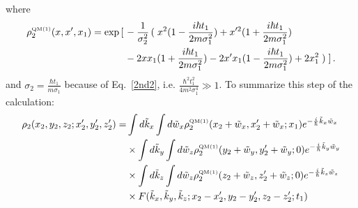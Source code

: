 \documentclass[12pt,groupedaddress,pra,aps]{revtex4-1}
\begin{document}
\begin{description}
where 
\begin{equation}\label{rho_3d_bg1}
\begin{split}
\rho^{\text{\tiny QM(1)}}_2(x,x',x_1)= \exp \left[\right.&
-\frac{1}{\sigma_2^2 } \left( \right. x^2 (1-\frac{i\hbar t_1}{2 m \sigma_1^2})
+ x'^2 (1+\frac{i\hbar t_1}{2 m \sigma_1^2}) \\
&-2 x x_1 (1+ \frac{i \hbar t_1}{2 m \sigma_1^2}) 
-2 x' x_1 (1 - \frac{i \hbar t_1}{2 m \sigma_1^2})    
+2 x_1^2 \left.\right)
\left.\right].
\end{split}
\end{equation}
and $\sigma_2=\frac{\hbar t_1}{m \sigma_1}$ because of Eq.~\eqref{2nd2}, i.e.
$\frac{\hbar^2 t_1^2}{4 m^2 \sigma_1^4} \gg 1$.
To summarize this step of the calculation:
\begin{equation}\label{rho_3d_bg}
\begin{split}
\rho_2(x_2, y_2, z_2;x'_2, y'_2, z'_2) = 
& \int d\tilde{k}_x \int d\tilde{w}_x \rho^{\text{\tiny QM(1)}}_2(x_2 + \tilde{w}_x ,x'_2 +\tilde{w}_x;x_1) e^{-\frac{i}{\hbar}\tilde{k}_x \tilde{w}_x}  \\
&\times\int d\tilde{k}_y \int d\tilde{w}_z \rho^{\text{\tiny QM(1)}}_2(y_2 +\tilde{w}_y ,y'_2 +\tilde{w}_y;0) e^{-\frac{i}{\hbar}\tilde{k}_y \tilde{w}_y} \\
&\times \int d\tilde{k}_z \int d\tilde{w}_z \rho^{\text{\tiny QM(1)}}_2(z_2+\tilde{w}_z,z'_2+\tilde{w}_z;0) e^{-\frac{i}{\hbar}\tilde{k}_z \tilde{w}_z} \\
&\times F(\tilde{k}_x,\tilde{k}_y,\tilde{k}_z;x_2-x_2',y_2-y_2',z_2-z_2';t_1) 
\end{split}
\end{equation}


\end{description}
\end{document}
